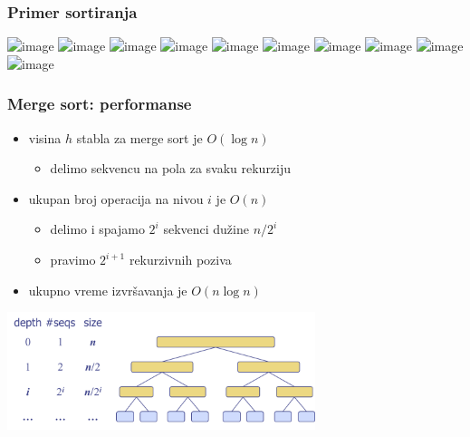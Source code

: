 \documentclass[compress]{beamer}
\begin{document}
\begin{frame}[fragile]
  \frametitle{Primer sortiranja}
  \begin{itemize}
  \end{itemize}
  \begin{center}
    \includegraphics<1>[width=11cm]{asp-12-pic03.png}
    \includegraphics<2>[width=11cm]{asp-12-pic04.png}
    \includegraphics<3>[width=11cm]{asp-12-pic05.png}
    \includegraphics<4>[width=11cm]{asp-12-pic06.png}
    \includegraphics<5>[width=11cm]{asp-12-pic07.png}
    \includegraphics<6>[width=11cm]{asp-12-pic08.png}
    \includegraphics<7>[width=11cm]{asp-12-pic09.png}
    \includegraphics<8>[width=11cm]{asp-12-pic10.png}
    \includegraphics<9>[width=11cm]{asp-12-pic11.png}
    \includegraphics<10>[width=11cm]{asp-12-pic12.png}
  \end{center}
\end{frame}

\begin{frame}[fragile]
  \frametitle{Merge sort: performanse}
  \begin{itemize}
    \item visina $h$ stabla za merge sort je $O(\log n)$
    \begin{itemize}
      \item delimo sekvencu na pola za svaku rekurziju
    \end{itemize}
    \item ukupan broj operacija na nivou $i$ je $O(n)$
    \begin{itemize}
      \item delimo i spajamo $2^i$ sekvenci dužine $n/2^i$
      \item pravimo $2^{i+1}$ rekurzivnih poziva
    \end{itemize}
    \item ukupno vreme izvršavanja je $O(n\log n)$
  \end{itemize}
  \begin{center}
    \includegraphics[width=9cm]{asp-12-pic13.png}
  \end{center}
\end{frame}
\end{document}
